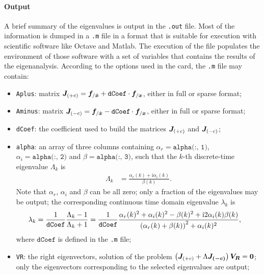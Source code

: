 \paragraph{Output}
A brief summary of the eigenvalues is output in the \texttt{.out} file.
Most of the information is dumped in a \texttt{.m} file in a format
that is suitable for execution with scientific software like
Octave and Matlab.
The execution of the file populates the environment of those software
with a set of variables that contains the results of the eigenanalysis.
According to the options used in the  card,
the \texttt{.m} file may contain:
\begin{itemize}
\item \texttt{Aplus}: 
matrix
$\boldsymbol{J}_{(+c)} = \boldsymbol{f}_{/\dot{\boldsymbol{x}}} + \texttt{dCoef} \cdot \boldsymbol{f}_{/\boldsymbol{x}}$,
either in full or sparse format;

\item \texttt{Aminus}: 
matrix
$\boldsymbol{J}_{(-c)} = \boldsymbol{f}_{/\dot{\boldsymbol{x}}} - \texttt{dCoef} \cdot \boldsymbol{f}_{/\boldsymbol{x}}$,
either in full or sparse format;

\item \texttt{dCoef}: the coefficient used to build the matrices
$\boldsymbol{J}_{(+c)}$ and $\boldsymbol{J}_{(-c)}$;

\item \texttt{alpha}:
an array of three columns containing
$\alpha_r = \texttt{alpha(:, 1)}$,
$\alpha_i = \texttt{alpha(:, 2)}$
and $\beta = \texttt{alpha(:, 3)}$,
such that the $k$-th discrete-time eigenvalue $\Lambda_k$ is
\begin{align}
	\Lambda_k
	&=
	\frac{\alpha_r(k) + \text{i} \alpha_i(k)}{\beta(k)}
	.
\end{align}
Note that $\alpha_r$, $\alpha_i$ and $\beta$ can be all zero;
only a fraction of the eigenvalues may be output;
the corresponding continuous time domain eigenvalue $\lambda_k$ is
\begin{align}
	\lambda_k
	&=
	\frac{1}{\texttt{dCoef}}
	\frac{\Lambda_k - 1}{\Lambda_k + 1}
	=
	\frac{1}{\texttt{dCoef}}
	\frac{
		\alpha_r(k)^2
		+
		\alpha_i(k)^2
		-
		\beta(k)^2
		+
		\text{i} 2 \alpha_i(k) \beta(k)
	}{
		\left( \alpha_r(k) + \beta(k) \right)^2 + \alpha_i(k)^2
	}
	,
\end{align}
where $\texttt{dCoef}$ is defined in the \texttt{.m} file;

\item \texttt{VR}: the right eigenvectors, solution of the problem
$\left( \boldsymbol{J}_{(+c)} + \Lambda \boldsymbol{J_{(-c)}} \right)\boldsymbol{V_R}=\boldsymbol{0}$;
only the eigenvectors corresponding to the selected eigenvalues are output;


\end{itemize}
